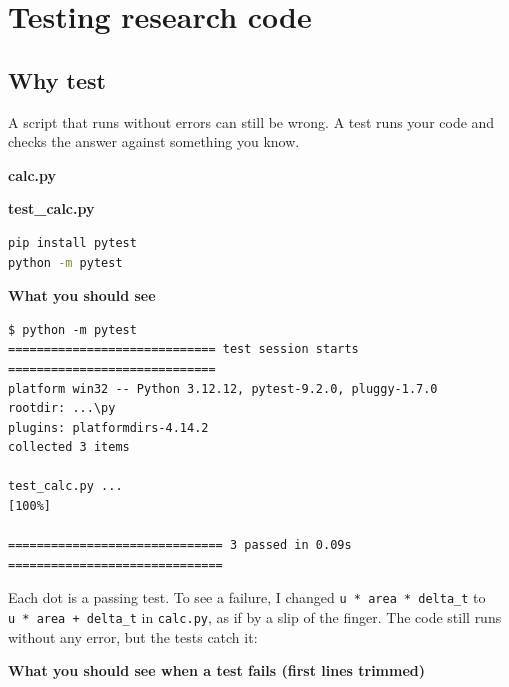 \chapter{Testing research code}
\label{ch:testing}

\section{Why test}\label{why-test}

A script that runs without errors can still be wrong. A test runs your code and checks the answer against something you know.

\textbf{calc.py}



\textbf{test\_calc.py}



\begin{lstlisting}[language=bash]
pip install pytest
python -m pytest
\end{lstlisting}

\textbf{What you should see}

\begin{lstlisting}[language=text]
$ python -m pytest
============================= test session starts =============================
platform win32 -- Python 3.12.12, pytest-9.2.0, pluggy-1.7.0
rootdir: ...\py
plugins: platformdirs-4.14.2
collected 3 items

test_calc.py ...                                                         [100%]

============================== 3 passed in 0.09s ==============================
\end{lstlisting}

Each dot is a passing test. To see a failure, I changed \texttt{u\ *\ area\ *\ delta\_t} to \texttt{u\ *\ area\ +\ delta\_t} in \texttt{calc.py}, as if by a slip of the finger. The code still runs without any error, but the tests catch it:

\textbf{What you should see when a test fails (first lines trimmed)}

